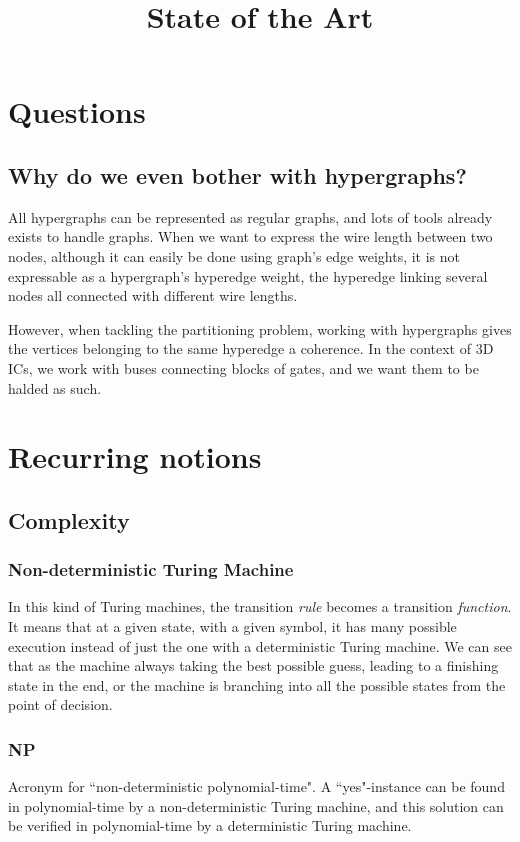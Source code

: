 \documentclass[12pt,a4paper]{article}
\title{State of the Art}
\begin{document}
\maketitle
\tableofcontents

\section{Questions}
\subsection{Why do we even bother with hypergraphs?}
All hypergraphs can be represented as regular graphs, and lots of tools already exists to handle graphs.
When we want to express the wire length between two nodes, although it can easily be done using graph's edge weights, it is not expressable as a hypergraph's hyperedge weight, the hyperedge linking several nodes all connected with different wire lengths.

However, when tackling the partitioning problem, working with hypergraphs gives the vertices belonging to the same hyperedge a coherence.
In the context of 3D ICs, we work with buses connecting blocks of gates, and we want them to be halded as such.


\section{Recurring notions}
\subsection{Complexity}


\subsubsection{Non-deterministic Turing Machine}
In this kind of Turing machines, the transition \textit{rule} becomes a transition \textit{function}.
It means that at a given state, with a given symbol, it has many possible execution instead of just the one with a deterministic Turing machine.
We can see that as the machine always taking the best possible guess, leading to a finishing state in the end, or the machine is branching into all the possible states from the point of decision.

\subsubsection{NP}
Acronym for ``non-deterministic polynomial-time".
A ``yes"-instance can be found in polynomial-time by a non-deterministic Turing machine, and this solution can be verified in polynomial-time by a deterministic Turing machine.
\end{document}
